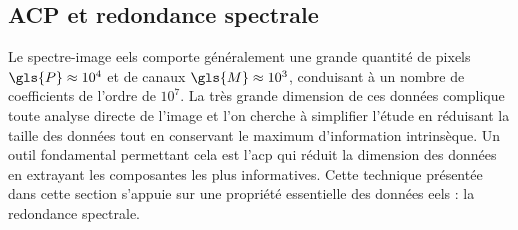     \subsection{ACP et redondance spectrale}\label{sec-acp-redondance}

    Le spectre-image \gls{eels} comporte généralement une grande quantité de pixels $\gls{P}\approx 10^4$ et de canaux $\gls{M}\approx 10^3$, conduisant à un nombre de coefficients de l'ordre de $10^7$. La très grande dimension de ces données complique toute analyse directe de l'image et l'on cherche à simplifier l'étude en réduisant la taille des données tout en conservant le maximum d'information intrinsèque. Un outil fondamental permettant cela est l'\gls{acp} qui réduit la dimension des données en extrayant les composantes les plus informatives. Cette technique présentée dans cette section s'appuie sur une propriété essentielle des données \gls{eels} : la redondance spectrale.

